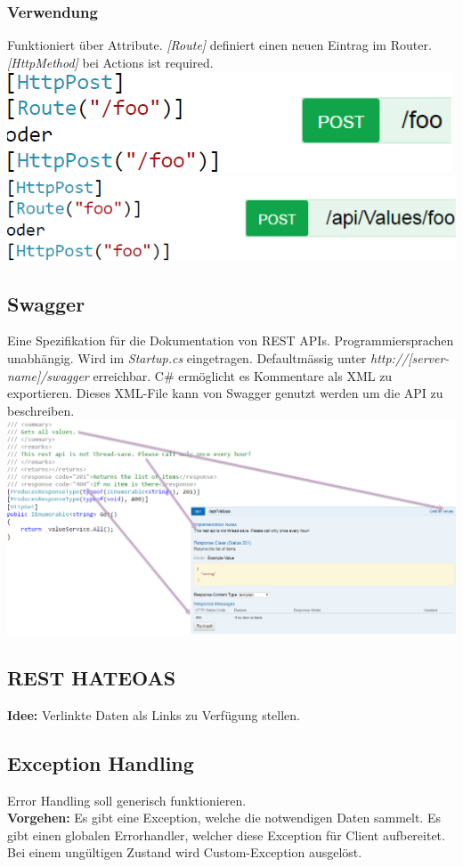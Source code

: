 \subsubsection{Verwendung}
Funktioniert über Attribute. \textit{[Route]} definiert einen neuen Eintrag im Router.
\textit{[HttpMethod]} bei Actions ist required.\\
\includegraphics[width=0.45\linewidth]{img/asp_api_routing.png}
\includegraphics[width=0.55\linewidth]{img/asp_api_routing2.png}

\subsection{Swagger}
Eine Spezifikation für die Dokumentation von REST APIs.
Programmiersprachen unabhängig.
Wird im \textit{Startup.cs} eingetragen.
Defaultmässig unter \textit{http://[server-name]/swagger} erreichbar.
C\# ermöglicht es Kommentare als XML zu exportieren.
Dieses XML-File kann von Swagger genutzt werden um die API zu beschreiben.
\includegraphics[width=\linewidth]{img/asp_swagger.png}

\subsection{REST HATEOAS}
\textbf{Idee:} Verlinkte Daten als Links zu Verfügung stellen.

\subsection{Exception Handling}
Error Handling soll generisch funktionieren.\\
\textbf{Vorgehen:} Es gibt eine Exception, welche die notwendigen Daten sammelt.
Es gibt einen globalen Errorhandler, welcher diese Exception für Client aufbereitet.
Bei einem ungültigen Zustand wird Custom-Exception ausgelöst.